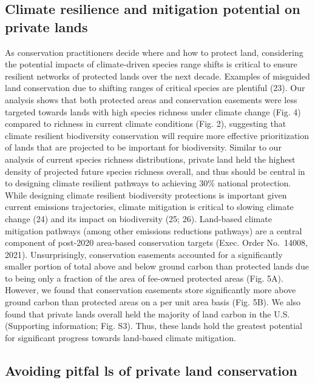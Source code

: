 \documentclass[3p]{elsarticle} %
\begin{document}
\hypertarget{climate-resilience-and-mitigation-potential-on-private-lands}{%
\subsection{Climate resilience and mitigation potential on private
lands}\label{climate-resilience-and-mitigation-potential-on-private-lands}}

As conservation practitioners decide where and how to protect land,
considering the potential impacts of climate-driven species range shifts
is critical to ensure resilient networks of protected lands over the
next decade. Examples of misguided land conservation due to shifting
ranges of critical species are plentiful (23). Our analysis shows that
both protected areas and conservation easements were less targeted
towards lands with high species richness under climate change (Fig. 4)
compared to richness in current climate conditions (Fig. 2), suggesting
that climate resilient biodiversity conservation will require more
effective prioritization of lands that are projected to be important for
biodiversity. Similar to our analysis of current species richness
distributions, private land held the highest density of projected future
species richness overall, and thus should be central in to designing
climate resilient pathways to achieving 30\% national protection. While
designing climate resilient biodiversity protections is important given
current emissions trajectories, climate mitigation is critical to
slowing climate change (24) and its impact on biodiversity (25; 26).
Land-based climate mitigation pathways (among other emissions reductions
pathways) are a central component of post-2020 area-based conservation
targets (Exec. Order No.~14008, 2021). Unsurprisingly, conservation
easements accounted for a significantly smaller portion of total above
and below ground carbon than protected lands due to being only a
fraction of the area of fee-owned protected areas (Fig. 5A). However, we
found that conservation easements store significantly more above ground
carbon than protected areas on a per unit area basis (Fig. 5B). We also
found that private lands overall held the majority of land carbon in the
U.S. (Supporting information; Fig. S3). Thus, these lands hold the
greatest potential for significant progress towards land-based climate
mitigation.

\hypertarget{avoiding-pitfal-ls-of-private-land-conservation}{%
\subsection{Avoiding pitfal ls of private land
conservation}\label{avoiding-pitfal-ls-of-private-land-conservation}}
\end{document}
